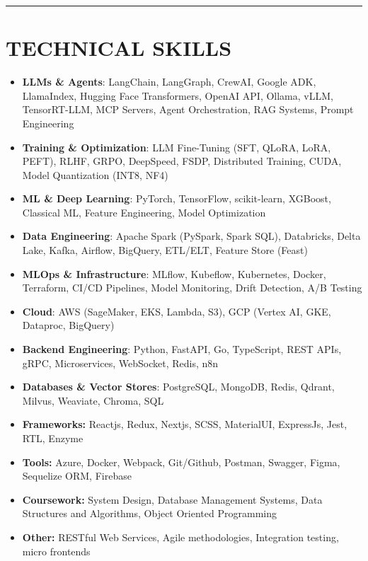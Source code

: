 \documentclass[100pt,a4paper]{article}
\newcommand{\sectionline}{
\begin{center}
\vspace{-10pt}
\rule{1\textwidth}{0.5pt}
\end{center}
\vspace{1pt}
}
\begin{document}
\sectionline
\section*{TECHNICAL SKILLS}
\setlength{\arrayrulewidth}{1.2pt}
\begin{itemize}
\item \textbf{LLMs \& Agents}{: LangChain, LangGraph, CrewAI, Google ADK, LlamaIndex, Hugging Face Transformers, OpenAI API, Ollama, vLLM, TensorRT-LLM, MCP Servers, Agent Orchestration, RAG Systems, Prompt Engineering}
\item \textbf{Training \& Optimization}{: LLM Fine-Tuning (SFT, QLoRA, LoRA, PEFT), RLHF, GRPO, DeepSpeed, FSDP, Distributed Training, CUDA, Model Quantization (INT8, NF4)}
\item \textbf{ML \& Deep Learning}{: PyTorch, TensorFlow, scikit-learn, XGBoost, Classical ML, Feature Engineering, Model Optimization}
\item \textbf{Data Engineering}{: Apache Spark (PySpark, Spark SQL), Databricks, Delta Lake, Kafka, Airflow, BigQuery, ETL/ELT, Feature Store (Feast)}
\item \textbf{MLOps \& Infrastructure}{: MLflow, Kubeflow, Kubernetes, Docker, Terraform, CI/CD Pipelines, Model Monitoring, Drift Detection, A/B Testing}
\item \textbf{Cloud}{: AWS (SageMaker, EKS, Lambda, S3), GCP (Vertex AI, GKE, Dataproc, BigQuery)}
\item \textbf{Backend Engineering}{: Python, FastAPI, Go, TypeScript, REST APIs, gRPC, Microservices, WebSocket, Redis, n8n}
\item \textbf{Databases \& Vector Stores}{: PostgreSQL, MongoDB, Redis, Qdrant, Milvus, Weaviate, Chroma, SQL}
\item \textbf{Frameworks:} Reactjs, Redux, Nextjs, SCSS, MaterialUI, ExpressJs, Jest, RTL, Enzyme
\item \textbf{Tools:} Azure, Docker, Webpack, Git/Github, Postman, Swagger, Figma, Sequelize ORM, Firebase
\item \textbf{Coursework:} System Design, Database Management Systems, Data Structures and Algorithms, Object Oriented Programming
\item \textbf{Other:} RESTful Web Services, Agile methodologies, Integration testing, micro frontends
\end{itemize}
\end{document}

